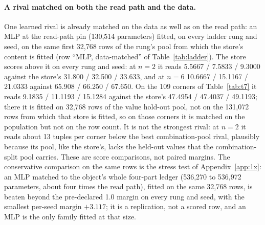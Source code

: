 \documentclass{article} %
\begin{document}
\paragraph{A rival matched on both the read path and the data.} One learned rival is already
matched on the data as well as on the read path: an MLP at the read-path pin (130,514 parameters) %
fitted, on every ladder rung and seed, on the same first 32,768 rows of the rung's pool from which %
the store's content is fitted (row ``MLP, data-matched'' of Table~\ref{tab:ladder}). The store
scores above it on every rung and seed: at $n=2$ it reads 5.5667 / 7.5833 / 9.3000 against the %
store's 31.800 / 32.500 / 33.633, and at $n=6$ 10.6667 / 15.1167 / 21.0333 against 65.908 / %
66.250 / 67.650. On the 109 corners of Table~\ref{tab:t7} it reads 9.1835 / 11.1193 / 15.1284 %
against the store's 47.4954 / 47.4037 / 49.1193; there it is fitted on 32,768 rows of the value %
hold-out pool, not on the 131,072 rows from which that store is fitted, so on those corners it is %
matched on the population but not on the row count. It is not the strongest rival: at $n=2$ it
reads about 13 tuples per corner below the best combination-pool rival, plausibly because its pool, %
like the store's, lacks the held-out values that the combination-split pool carries. These are
score comparisons, not paired margins. The conservative comparison on the same rows is the stress
test of Appendix~\ref{app:1x}: an MLP matched to the object's whole four-part ledger (536,270 to %
536,972 parameters, about four times the read path), fitted on the same 32,768 rows, is beaten %
beyond the pre-declared 1.0 margin on every rung and seed, with the smallest per-seed margin $+3.117$; %
it is a replication, not a scored row, and an MLP is the only family fitted at that size.
\end{document}
